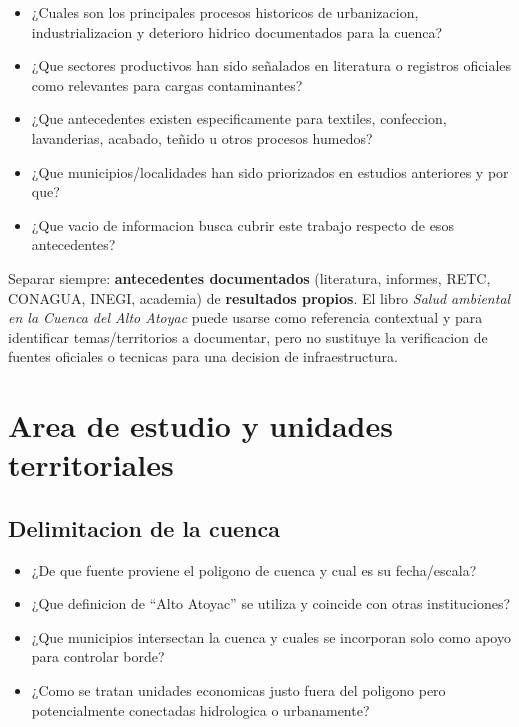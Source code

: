 \documentclass[11pt,letterpaper]{article}
\begin{document}
\begin{preguntas}
\begin{itemize}
    \item ¿Cuales son los principales procesos historicos de urbanizacion, industrializacion y deterioro hidrico documentados para la cuenca?
    \item ¿Que sectores productivos han sido señalados en literatura o registros oficiales como relevantes para cargas contaminantes?
    \item ¿Que antecedentes existen especificamente para textiles, confeccion, lavanderias, acabado, teñido u otros procesos humedos?
    \item ¿Que municipios/localidades han sido priorizados en estudios anteriores y por que?
    \item ¿Que vacio de informacion busca cubrir este trabajo respecto de esos antecedentes?
\end{itemize}
\end{preguntas}

\begin{evidencia}
Separar siempre: \textbf{antecedentes documentados} (literatura, informes, RETC, CONAGUA, INEGI, academia) de \textbf{resultados propios}. El libro \textit{Salud ambiental en la Cuenca del Alto Atoyac} puede usarse como referencia contextual y para identificar temas/territorios a documentar, pero no sustituye la verificacion de fuentes oficiales o tecnicas para una decision de infraestructura.
\end{evidencia}

\section{Area de estudio y unidades territoriales}

\subsection{Delimitacion de la cuenca}
\begin{preguntas}
\begin{itemize}
    \item ¿De que fuente proviene el poligono de cuenca y cual es su fecha/escala?
    \item ¿Que definicion de ``Alto Atoyac'' se utiliza y coincide con otras instituciones?
    \item ¿Que municipios intersectan la cuenca y cuales se incorporan solo como apoyo para controlar borde?
    \item ¿Como se tratan unidades economicas justo fuera del poligono pero potencialmente conectadas hidrologica o urbanamente?
\end{itemize}
\end{preguntas}
\end{document}
